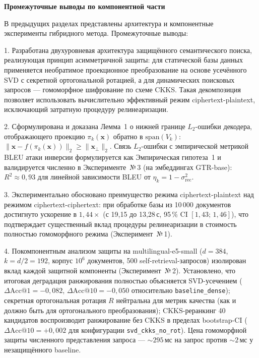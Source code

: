 \documentclass[a4paper, 12pt, oneside, openany]{article}
\begin{document}
\textbf{Промежуточные выводы по компонентной части }

В  предыдущих разделах представлены архитектура и компонентные эксперименты гибридного метода. Промежуточные выводы:

1. Разработана двухуровневая архитектура защищённого семантического поиска, реализующая принцип асимметричной защиты: для статической базы данных применяется необратимое проекционное преобразование на основе усечённого SVD с секретной ортогональной ротацией, а для динамических поисковых запросов --- гомоморфное шифрование по схеме CKKS. Такая декомпозиция позволяет использовать вычислительно эффективный режим ciphertext-plaintext, исключающий затратную процедуру релинеаризации.

2. Сформулирована и доказана Лемма~1 о нижней границе $L_2$-ошибки декодера, отображающего проекцию $\pi_k(\mathbf{x})$ обратно в $\mathrm{span}(V_k)$: $\|\mathbf{x} - f(\pi_k(\mathbf{x}))\|_{2} \geq \|\mathbf{x}_{\perp}\|_{2}$. Связь $L_2$-ошибки с эмпирической метрикой BLEU атаки инверсии формулируется как Эмпирическая гипотеза~1 и валидируется численно в Эксперименте~№\,3 (на эмбеддингах GTR-base): $R^{2} \approx 0{,}93$ для линейной зависимости BLEU от $\eta_k = 1 - \sigma_{\mathrm{rec}}^{2}$.

3. Экспериментально обосновано преимущество режима ciphertext-plaintext над режимом ciphertext-ciphertext: при обработке базы из 10\,000 документов достигнуто ускорение в $1{,}44\times$ (с 19,15 до 13,28\,с, 95\,\% CI $[1{,}43;\, 1{,}46]$), что подтверждает существенный вклад процедуры релинеаризации в стоимость полностью гомоморфного режима (Эксперимент~№\,1).

4. Покомпонентным анализом защиты на multilingual-e5-small ($d = 384$, $k = d/2 = 192$, корпус $10^6$ документов, 500 self-retrieval-запросов) изолирован вклад каждой защитной компоненты (Эксперимент~№\,2). Установлено, что итоговая деградация ранжирования полностью объясняется SVD-усечением ($\Delta\mathrm{Acc@1} = -0{,}082$, $\Delta\mathrm{Acc@10} = -0{,}050$ относительно \texttt{baseline\_dense}); секретная ортогональная ротация $R$ нейтральна для метрик качества (как и должно быть для ортогонального преобразования); CKKS-реранкинг 40 кандидатов воспроизводит ранжирование без CKKS в пределах bootstrap-CI ($\Delta\mathrm{Acc@10} = +0{,}002$ для конфигурации \texttt{svd\_ckks\_no\_rot}). Цена гомоморфной защиты численного представления запроса --- $\sim 295$\,мс на запрос против $\sim 2$\,мс у незащищённого baseline.
\end{document}
